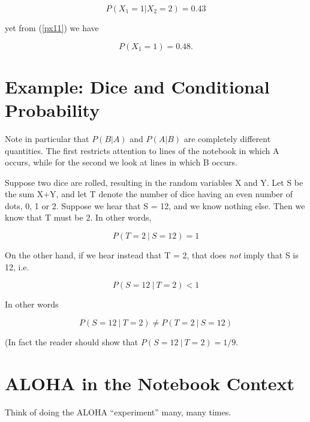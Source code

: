 \begin{equation}
P(X_1 = 1 | X_2 = 2) = 0.43
\end{equation}

yet from (\ref{px11}) we have

\begin{equation}
P(X_1 = 1) = 0.48.
\end{equation}

\section{Example: Dice and Conditional Probability}

Note in particular that $P(B | A)$ and $P(A | B)$ are completely
different quantities.  The first restricts attention to lines of the
notebook in which A occurs, while for the second we look at lines in
which B occurs.

Suppose two dice are rolled, resulting in the random variables X and Y.
Let S be the sum X+Y, and let T denote the number of dice having an
even number of dots, 0, 1 or 2.  Suppose we hear that S = 12, and we know
nothing else.  Then we know that T must be 2.  In other words,

\begin{equation}
P(T = 2 ~|~ S = 12) = 1
\end{equation}

On the other hand, if we hear instead that T = 2, that does {\it not}
imply that S is 12, i.e.

\begin{equation}
P(S = 12 ~|~ T = 2) < 1
\end{equation}

In other words

\begin{equation}
P(S = 12 ~|~ T = 2) \neq
P(T = 2 ~|~ S = 12)
\end{equation}

(In fact the reader should show that $P(S = 12 ~|~ T = 2) = 1/9$.

\section{ALOHA in the Notebook Context}

Think of doing the ALOHA ``experiment'' many, many times.

